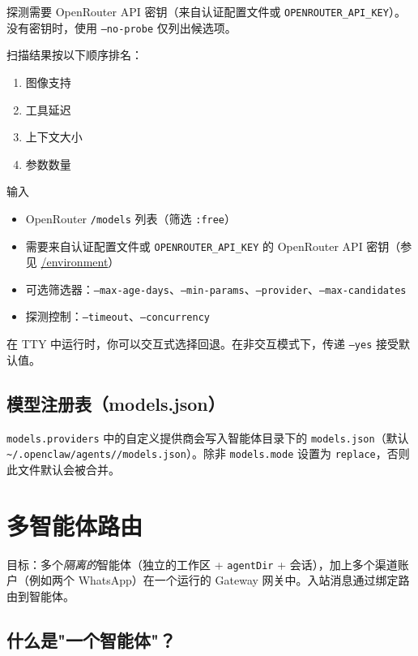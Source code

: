 探测需要 OpenRouter API 密钥（来自认证配置文件或 \texttt{OPENROUTER\_API\_KEY}）。没有密钥时，使用 \texttt{--no-probe} 仅列出候选项。

扫描结果按以下顺序排名：

\begin{enumerate}
  \item 图像支持
  \item 工具延迟
  \item 上下文大小
  \item 参数数量
\end{enumerate}


输入

\begin{itemize}
  \item OpenRouter \texttt{/models} 列表（筛选 \texttt{:free}）
  \item 需要来自认证配置文件或 \texttt{OPENROUTER\_API\_KEY} 的 OpenRouter API 密钥（参见 \href{/help/environment}{/environment}）
  \item 可选筛选器：\texttt{--max-age-days}、\texttt{--min-params}、\texttt{--provider}、\texttt{--max-candidates}
  \item 探测控制：\texttt{--timeout}、\texttt{--concurrency}
\end{itemize}


在 TTY 中运行时，你可以交互式选择回退。在非交互模式下，传递 \texttt{--yes} 接受默认值。

\subsection{模型注册表（models.json）}


\texttt{models.providers} 中的自定义提供商会写入智能体目录下的 \texttt{models.json}（默认 \texttt{\textasciitilde{}/.openclaw/agents//models.json}）。除非 \texttt{models.mode} 设置为 \texttt{replace}，否则此文件默认会被合并。


\clearpage

\section{多智能体路由}


目标：多个\textit{隔离的}智能体（独立的工作区 + \texttt{agentDir} + 会话），加上多个渠道账户（例如两个 WhatsApp）在一个运行的 Gateway 网关中。入站消息通过绑定路由到智能体。

\subsection{什么是"一个智能体"？}


